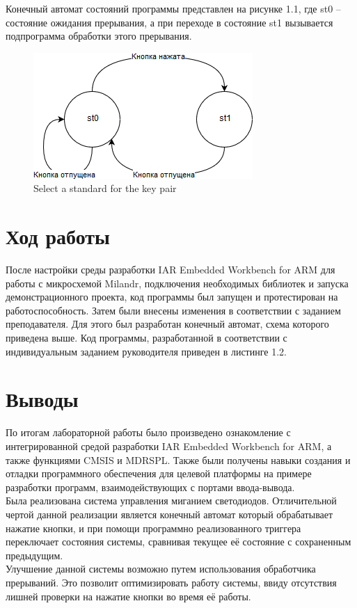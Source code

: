 \documentclass[14pt,a4paper,report]{report}
\begin{document}
Конечный автомат состояний программы представлен на рисунке 1.1, где st0 – состояние ожидания прерывания, а при переходе в состояние st1 вызывается подпрограмма обработки этого прерывания.

\begin{figure}[h!]
	\centering
	\includegraphics[scale = 1]{img/1_1.png}
	\caption{Select a standard for the key pair}
\end{figure}

\section{Ход работы}

После настройки среды разработки IAR Embedded Workbench for ARM для работы с микросхемой Milandr, подключения необходимых библиотек и запуска демонстрационного проекта, код программы был запущен и протестирован на работоспособность. Затем были внесены изменения в соответствии с заданием преподавателя. Для этого был разработан конечный автомат, схема которого приведена выше. 
Код программы, разработанной в соответствии с индивидуальным заданием руководителя приведен в листинге 1.2. 




\section{Выводы}
По итогам лабораторной работы было произведено ознакомление с интегрированной средой разработки IAR Embedded Workbench for ARM, а также функциями CMSIS и MDRSPL. Также были получены навыки создания и отладки программного обеспечения для целевой платформы на примере разработки программ, взаимодействующих с портами ввода-вывода. \\
\indent Была реализована система управления миганием светодиодов. Отличительной чертой данной реализации является конечный автомат который обрабатывает нажатие кнопки, и при помощи программно реализованного триггера переключает состояния системы, сравнивая текущее её состояние с сохраненным предыдущим. \\
\indent Улучшение данной системы возможно путем использования обработчика прерываний. Это позволит оптимизировать работу системы, ввиду отсутствия лишней проверки на нажатие кнопки во время её работы.
\end{document}
